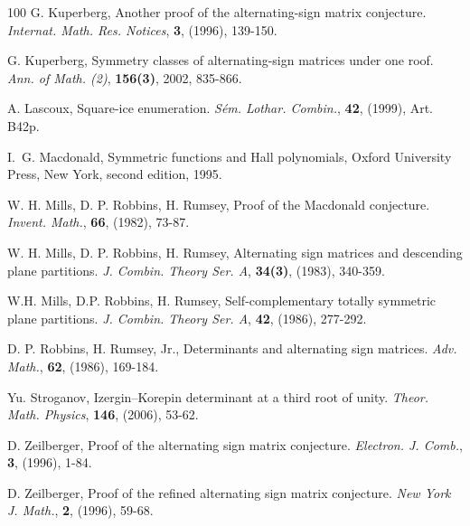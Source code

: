 \documentclass[12pt, a4paper]{amsart} %
\numberwithin{equation}{section}
\begin{document}
\begin{thebibliography}{100}
G. Kuperberg, Another proof of the alternating-sign matrix conjecture. {\em Internat. Math. Res. Notices}, {\bf 3}, (1996), 139-150.

G. Kuperberg, Symmetry classes of alternating-sign matrices under one roof. {\em Ann. of Math. (2)}, {\bf 156(3)}, 2002, 835-866.

A. Lascoux, Square-ice enumeration. {\em S\'em. Lothar. Combin.}, {\bf 42}, (1999), Art. B42p.

I.~G. Macdonald, Symmetric functions and Hall polynomials, Oxford University Press, New York, second edition, 1995.


W. H. Mills, D. P. Robbins, H. Rumsey, Proof of the Macdonald conjecture. {\em Invent. Math.}, {\bf 66}, (1982), 73-87.

W. H. Mills, D. P. Robbins, H. Rumsey, Alternating sign matrices and descending plane partitions. {\em J. Combin. Theory Ser. A}, {\bf 34(3)}, (1983), 340-359.

W.H. Mills, D.P. Robbins, H. Rumsey, Self-complementary totally symmetric plane partitions. {\em J. Combin. Theory Ser. A}, {\bf 42}, (1986), 277-292.



D. P. Robbins, H. Rumsey, Jr., Determinants and alternating sign matrices. {\em Adv. Math.}, {\bf 62}, (1986), 169-184.

Yu. Stroganov, Izergin–Korepin determinant at a third root of unity. {\em Theor. Math. Physics}, {\bf 146}, (2006), 53-62.

D. Zeilberger, Proof of the alternating sign matrix conjecture. {\em Electron. J. Comb.}, {\bf 3}, (1996), 1-84.

D. Zeilberger, Proof of the refined alternating sign matrix conjecture. {\em New York J. Math.}, {\bf 2}, (1996), 59-68.
\end{thebibliography}
\end{document}
